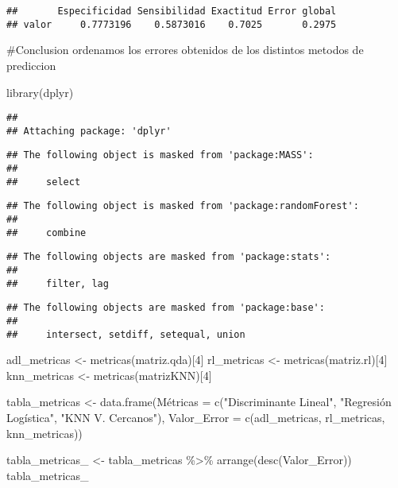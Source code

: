 \documentclass[
]{article}
\newenvironment{Shaded}{\begin{snugshade}}{\end{snugshade}}
\newcommand{\AttributeTok}[1]{\textcolor[rgb]{0.77,0.63,0.00}{#1}}
\newcommand{\DecValTok}[1]{\textcolor[rgb]{0.00,0.00,0.81}{#1}}
\newcommand{\FunctionTok}[1]{\textcolor[rgb]{0.00,0.00,0.00}{#1}}
\newcommand{\NormalTok}[1]{#1}
\newcommand{\OtherTok}[1]{\textcolor[rgb]{0.56,0.35,0.01}{#1}}
\newcommand{\SpecialCharTok}[1]{\textcolor[rgb]{0.00,0.00,0.00}{#1}}
\newcommand{\StringTok}[1]{\textcolor[rgb]{0.31,0.60,0.02}{#1}}
\begin{document}
\begin{verbatim}
##       Especificidad Sensibilidad Exactitud Error global
## valor     0.7773196    0.5873016    0.7025       0.2975
\end{verbatim}

\#Conclusion ordenamos los errores obtenidos de los distintos metodos de
prediccion

\begin{Shaded}
\begin{Highlighting}[]
\FunctionTok{library}\NormalTok{(dplyr)}
\end{Highlighting}
\end{Shaded}

\begin{verbatim}
## 
## Attaching package: 'dplyr'
\end{verbatim}

\begin{verbatim}
## The following object is masked from 'package:MASS':
## 
##     select
\end{verbatim}

\begin{verbatim}
## The following object is masked from 'package:randomForest':
## 
##     combine
\end{verbatim}

\begin{verbatim}
## The following objects are masked from 'package:stats':
## 
##     filter, lag
\end{verbatim}

\begin{verbatim}
## The following objects are masked from 'package:base':
## 
##     intersect, setdiff, setequal, union
\end{verbatim}

\begin{Shaded}
\begin{Highlighting}[]
\NormalTok{adl\_metricas }\OtherTok{\textless{}{-}} \FunctionTok{metricas}\NormalTok{(matriz.qda)[}\DecValTok{4}\NormalTok{]}
\NormalTok{rl\_metricas }\OtherTok{\textless{}{-}} \FunctionTok{metricas}\NormalTok{(matriz.rl)[}\DecValTok{4}\NormalTok{]}
\NormalTok{knn\_metricas }\OtherTok{\textless{}{-}} \FunctionTok{metricas}\NormalTok{(matrizKNN)[}\DecValTok{4}\NormalTok{]}

\NormalTok{tabla\_metricas }\OtherTok{\textless{}{-}} \FunctionTok{data.frame}\NormalTok{(Métricas }\OtherTok{=} \FunctionTok{c}\NormalTok{(}\StringTok{"Discriminante Lineal"}\NormalTok{, }\StringTok{"Regresión Logística"}\NormalTok{, }\StringTok{"KNN V. Cercanos"}\NormalTok{),}
                             \AttributeTok{Valor\_Error =} \FunctionTok{c}\NormalTok{(adl\_metricas, rl\_metricas, knn\_metricas))}

\NormalTok{tabla\_metricas\_ }\OtherTok{\textless{}{-}}\NormalTok{ tabla\_metricas }\SpecialCharTok{\%\textgreater{}\%} \FunctionTok{arrange}\NormalTok{(}\FunctionTok{desc}\NormalTok{(Valor\_Error))}
\NormalTok{tabla\_metricas\_}
\end{Highlighting}
\end{Shaded}
\end{document}
